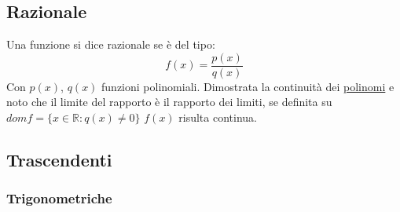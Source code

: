 \documentclass[10pt, oneside]{book}
\theoremstyle{plain}
\begin{document}
\subsection*{Razionale}
Una funzione si dice razionale se è del tipo:
\[f(x) = \frac{p(x)}{q(x)}\]
Con $p(x)$, $q(x)$ funzioni polinomiali. Dimostrata la continuità dei \hyperlink{contin}{polinomi} e noto che il limite del rapporto è il rapporto dei limiti, se definita su $domf = \{x \in \mathbb{R} : q(x) \neq 0\}$ $f(x)$ risulta continua.

\subsection*{Trascendenti}

\subsubsection{Trigonometriche}
\end{document}
